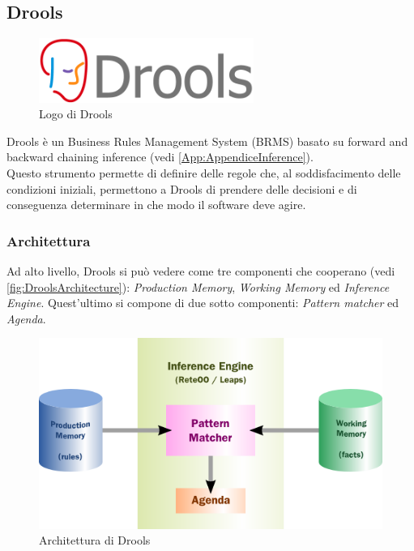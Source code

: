 \subsection{Drools}
	\begin{figure}[H]
		\begin{center}
			\includegraphics[width=7cm]{Pics/drools-logo.png}
			\caption{Logo di Drools}
			\label{fig:DroolsLogo}
		\end{center}
	\end{figure}
	Drools è un Business Rules Management System (BRMS) basato su forward and backward chaining inference (vedi \autoref{App:AppendiceInference}). \\
	Questo strumento permette di definire delle regole che, al soddisfacimento delle condizioni iniziali, permettono a Drools di prendere delle decisioni e di conseguenza determinare in che modo il software deve agire.
	\subsubsection{Architettura}
	Ad alto livello, Drools si può vedere come tre componenti che cooperano (vedi  \autoref{fig:DroolsArchitecture}):\textit{ Production Memory}, \textit{Working Memory} ed \textit{Inference Engine}. Quest'ultimo si compone di due sotto componenti: \textit{Pattern matcher} ed \textit{Agenda}.
	\begin{figure}[H]
		\begin{center}
			\includegraphics[width=12cm]{Pics/drools_abstract_structure.png}
			\caption{Architettura di Drools}
			\label{fig:DroolsArchitecture}
		\end{center}
	\end{figure}
	
